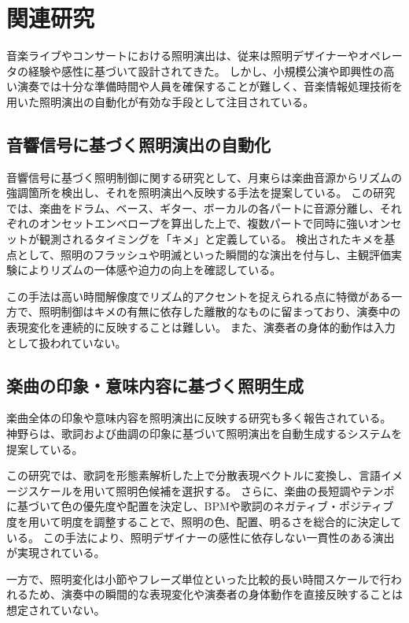 \section{関連研究} \label{sec:RelatedResearch}

音楽ライブやコンサートにおける照明演出は、従来は照明デザイナーやオペレータの経験や感性に基づいて設計されてきた。
しかし、小規模公演や即興性の高い演奏では十分な準備時間や人員を確保することが難しく、音楽情報処理技術を用いた照明演出の自動化が有効な手段として注目されている。

\subsection{音響信号に基づく照明演出の自動化}

音響信号に基づく照明制御に関する研究として、月東らは楽曲音源からリズムの強調箇所を検出し、それを照明演出へ反映する手法を提案している\cite{tsukihigashi25}。
この研究では、楽曲をドラム、ベース、ギター、ボーカルの各パートに音源分離し、それぞれのオンセットエンベロープを算出した上で、複数パートで同時に強いオンセットが観測されるタイミングを「キメ」と定義している。
検出されたキメを基点として、照明のフラッシュや明滅といった瞬間的な演出を付与し、主観評価実験によりリズムの一体感や迫力の向上を確認している。

この手法は高い時間解像度でリズム的アクセントを捉えられる点に特徴がある一方で、照明制御はキメの有無に依存した離散的なものに留まっており、演奏中の表現変化を連続的に反映することは難しい。
また、演奏者の身体的動作は入力として扱われていない。

\subsection{楽曲の印象・意味内容に基づく照明生成}

楽曲全体の印象や意味内容を照明演出に反映する研究も多く報告されている。
神野らは、歌詞および曲調の印象に基づいて照明演出を自動生成するシステムを提案している\cite{kanno21}。

この研究では、歌詞を形態素解析した上で分散表現ベクトルに変換し、言語イメージスケールを用いて照明色候補を選択する。
さらに、楽曲の長短調やテンポに基づいて色の優先度や配置を決定し、BPMや歌詞のネガティブ・ポジティブ度を用いて明度を調整することで、照明の色、配置、明るさを総合的に決定している。
この手法により、照明デザイナーの感性に依存しない一貫性のある演出が実現されている。

一方で、照明変化は小節やフレーズ単位といった比較的長い時間スケールで行われるため、演奏中の瞬間的な表現変化や演奏者の身体動作を直接反映することは想定されていない。

